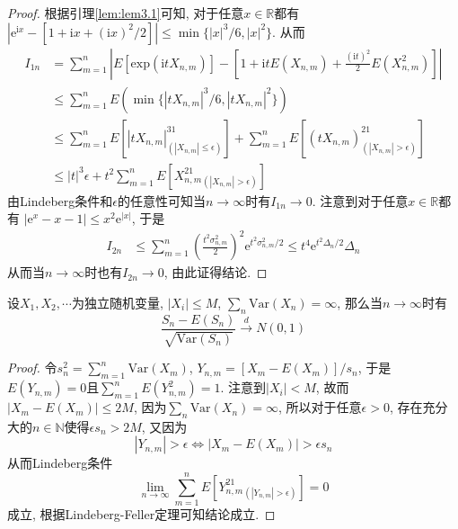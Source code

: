 \documentclass[cn, 12pt, math=mtpro2, bibstyle=apa, blue, twocol]{elegantbook}
\newcommand{\R}{\mathbb{R}}
\newcommand{\limn}{\lim_{n\to\infty}}
\begin{document}
\begin{proof}
  根据引理\ref{lem:lem3.1}可知, 对于任意$x\in\R$都有$|\text{e}^{\text{i}x}-[1+\text{i}x+(\text{i}x)^2/2]|\leq \min\{|x|^3/6,|x|^2\}$. 从而
  \begin{align*}
  I_{1n}&=\sum_{m=1}^{n}\left|E[\text{exp}(\text{i}tX_{n,m})]-\left[1+\text{i}tE(X_{n,m})+\frac{(\text{i}t)^2}{2}E(X_{n,m}^2)\right]\right| \\
  &\leq \sum_{m=1}^{n}E(\min\{|tX_{n,m}|^3/6,|tX_{n,m}|^2\}) \\
  &\leq \sum_{m=1}^{n}E[|tX_{n,m}|^31_{(|X_{n,m}|\leq\epsilon)}]+\sum_{m=1}^{n}E[(tX_{n,m})^21_{(|X_{n,m}|>\epsilon)}] \\
  &\leq |t|^3\epsilon+t^2\sum_{m=1}^{n}E[X_{n,m}^21_{(|X_{n,m}|>\epsilon)}]
  \end{align*}
  由Lindeberg条件和$\epsilon$的任意性可知当$n\to\infty$时有$I_{1n}\to0$. 注意到对于任意$x\in\R$都有
  $|\text{e}^x-x-1|\leq x^2\text{e}^{|x|}$, 于是
  \begin{align*}
  I_{2n}&\leq \sum_{m=1}^{n}\left(\frac{t^2\sigma_{n,m}^2}{2}\right)^2\text{e}^{t^2\sigma_{n,m}^2/2}\leq t^4\text{e}^{t^2\Delta_n/2}\Delta_n
  \end{align*}
  从而当$n\to\infty$时也有$I_{2n}\to0$, 由此证得结论.
\end{proof}

\begin{example}
设$X_1,X_2,\cdots$为独立随机变量, $|X_i|\leq M$, $\sum_n\text{Var}(X_n)=\infty$, 那么当$n\to\infty$时有
$$\frac{S_n-E(S_n)}{\sqrt{\text{Var}(S_n)}}\xrightarrow{d} N(0,1)$$
\end{example}
\begin{proof}
  令$s_n^2=\sum_{m=1}^{n}\text{Var}(X_m)$, $Y_{n,m}=[X_m-E(X_m)]/s_n$, 于是$E(Y_{n,m})=0$且$\sum_{m=1}^{n}E(Y_{n,m}^2)=1$. 注意到$|X_i|<M$, 故而$|X_m-E(X_m)|\leq 2M$, 因为$\sum_n\text{Var}(X_n)=\infty$, 所以对于任意$\epsilon>0$, 存在充分大的$n\in\mathbb{N}$使得$\epsilon s_n>2M$, 又因为
  $$|Y_{n,m}|>\epsilon \Leftrightarrow |X_m-E(X_m)|>\epsilon s_n$$
  从而Lindeberg条件
  $$\limn \sum_{m=1}^{n}E[Y_{n,m}^21_{(|Y_{n,m}|>\epsilon)}]=0$$
  成立, 根据Lindeberg-Feller定理可知结论成立.
\end{proof}
\end{document}
